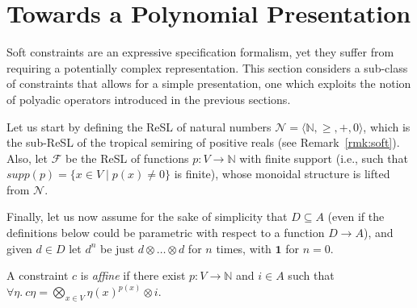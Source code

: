 \documentclass{llncs}
\newcommand{\comment}[1]{}
\def\1{{\mathbf 1}}
\def\monop{\otimes}
\begin{document}
%


\comment{
Note also that the diagonal elements are not guaranteed to be $\monop$-compact,
even if they have finite support, since $\top$ is not necessarily so.
%
To this end, we close the section by adding the simple result below to the soft constraint lore.

\begin{proposition}
	Let $c \in \mathbb{C}$ be a constraint. It is $\monop$-compact if and only if it has finite support and 
	$c\eta$ is $\monop$-compact for all $\eta$.
\end{proposition}
}

\section{Towards a Polynomial Presentation}\label{sec:polynomialsoftconstraints}
Soft constraints are an expressive specification formalism, yet they 
suffer from requiring a potentially complex representation.
%
This section considers a sub-class of constraints that allows 
for a simple presentation, one which exploits the notion of
polyadic operators introduced in the previous sections.

Let us start by defining the ReSL of natural numbers 
$\mathcal{N} = \langle \mathbb{N}, \geq, +, 0 \rangle$,
which is the sub-ReSL of the tropical semiring
of positive reals (see Remark~\ref{rmk:soft}).
%
Also, let $\mathcal{F}$
be the ReSL of functions $p: V \rightarrow \mathbb{N}$
with finite support (i.e., such that 
$supp(p) = \{ x \in V \mid  p(x) \neq 0\}$ is finite),
whose monoidal structure is lifted from $\mathcal{N}$.


Finally, let us now assume for the sake of simplicity that $D \subseteq A$ 
(even if the definitions below could be parametric with respect to
a function $D \rightarrow A$), and given $d \in D$ let
$d^n$ be just $d \otimes \ldots \otimes d$ for $n$ times,
with $\1$ for $n = 0$.

\begin{definition}\label{def:softconstraints}
	A constraint $c$ is \emph{affine} if there exist $p: V \rightarrow \mathbb{N}$ and $i \in A$ 
	such that $\forall\eta.\ c\eta = \bigotimes_{x \in  V} \eta(x)^{p(x)} \otimes i$.
\end{definition}
\end{document}

